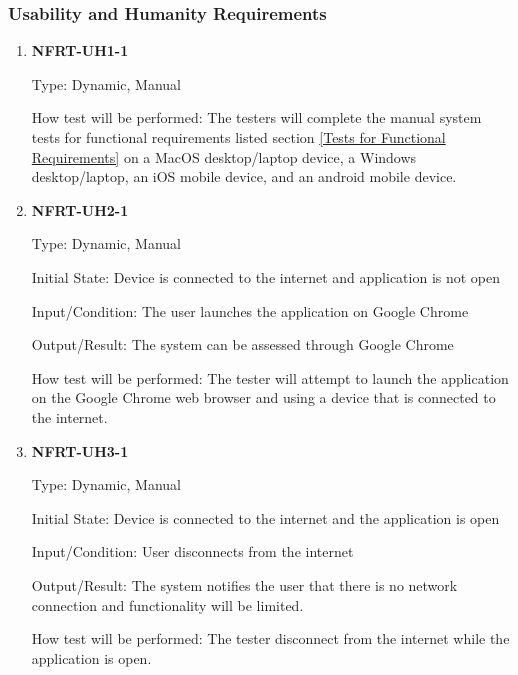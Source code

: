 \documentclass[12pt, titlepage]{article}
\begin{document}
\subsubsection{Usability and Humanity Requirements}
\begin{enumerate}

	\item \textbf{NFRT-UH1-1} %

	      Type: Dynamic, Manual

	      How test will be performed: The testers will complete the manual system tests for functional
	      requirements listed section \ref{Tests for Functional Requirements} on a MacOS desktop/laptop
	      device, a Windows desktop/laptop, an iOS mobile device, and an android mobile device.

	\item \textbf{NFRT-UH2-1} %

	      Type: Dynamic, Manual

	      Initial State: Device is connected to the internet and application is not open

	      Input/Condition: The user launches the application on Google Chrome

	      Output/Result: The system can be assessed through Google Chrome

	      How test will be performed: The tester will attempt to launch the application on the Google Chrome
	      web browser and using a device that is connected to the internet.

	\item \textbf{NFRT-UH3-1} %

	      Type: Dynamic, Manual

	      Initial State: Device is connected to the internet and the application is open

	      Input/Condition: User disconnects from the internet

	      Output/Result: The system notifies the user that there is no network connection and functionality
	      will be limited.

	      How test will be performed: The tester disconnect from the internet while the application is open.

\end{enumerate}
\end{document}
